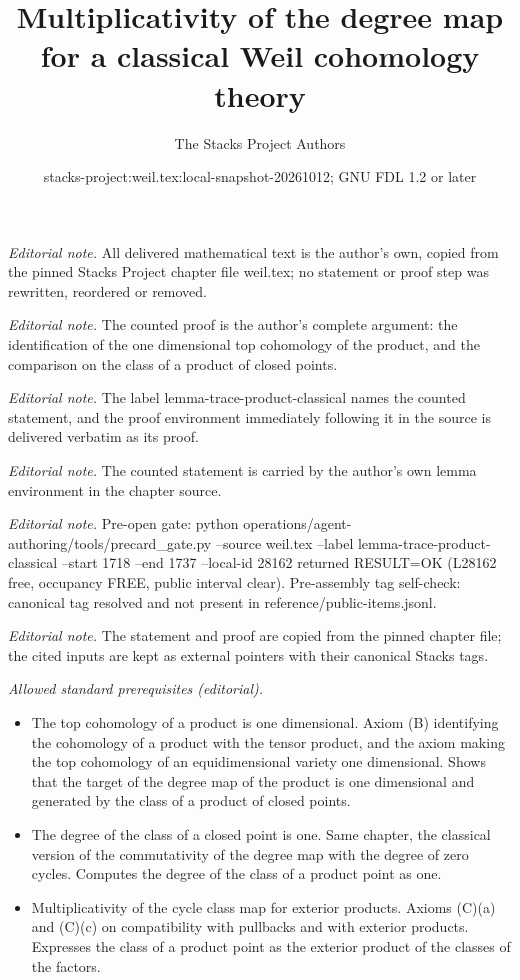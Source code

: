 \documentclass[10pt,a4paper]{amsart}
\title{Multiplicativity of the degree map for a classical Weil cohomology theory}
\author{The Stacks Project Authors}
\date{stacks-project:weil.tex:local-snapshot-20261012; GNU FDL 1.2 or later}
\theoremstyle{plain}
\theoremstyle{definition}
\theoremstyle{remark}
\numberwithin{equation}{subsection}
\begin{document}
\maketitle
\noindent\textit{Editorial note.} All delivered mathematical text is the author's own, copied from the pinned Stacks Project chapter file weil.tex; no statement or proof step was rewritten, reordered or removed.\par\medskip
\noindent\textit{Editorial note.} The counted proof is the author's complete argument: the identification of the one dimensional top cohomology of the product, and the comparison on the class of a product of closed points.\par\medskip
\noindent\textit{Editorial note.} The label lemma-trace-product-classical names the counted statement, and the proof environment immediately following it in the source is delivered verbatim as its proof.\par\medskip
\noindent\textit{Editorial note.} The counted statement is carried by the author's own lemma environment in the chapter source.\par\medskip
\noindent\textit{Editorial note.} Pre-open gate: python operations/agent-authoring/tools/precard\_gate.py --source weil.tex --label lemma-trace-product-classical --start 1718 --end 1737 --local-id 28162 returned RESULT=OK (L28162 free, occupancy FREE, public interval clear). Pre-assembly tag self-check: canonical tag resolved and not present in reference/public-items.jsonl.\par\medskip
\noindent\textit{Editorial note.} The statement and proof are copied from the pinned chapter file; the cited inputs are kept as external pointers with their canonical Stacks tags.\par\medskip
\noindent\textit{Allowed standard prerequisites (editorial).}\begin{itemize}
\item The top cohomology of a product is one dimensional. Axiom (B) identifying the cohomology of a product with the tensor product, and the axiom making the top cohomology of an equidimensional variety one dimensional. Shows that the target of the degree map of the product is one dimensional and generated by the class of a product of closed points.
\item The degree of the class of a closed point is one. Same chapter, the classical version of the commutativity of the degree map with the degree of zero cycles. Computes the degree of the class of a product point as one.
\item Multiplicativity of the cycle class map for exterior products. Axioms (C)(a) and (C)(c) on compatibility with pullbacks and with exterior products. Expresses the class of a product point as the exterior product of the classes of the factors.
\end{itemize}\medskip
\end{document}
